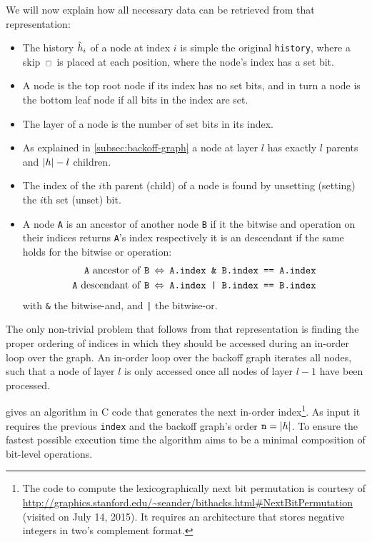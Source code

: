 We will now explain how all necessary data can be retrieved from that
representation:
\begin{itemize}
  \setlength{\itemsep}{0.4ex}
  \item The history $\DerivedHistory[i]$ of a node at index $i$ is simple
    the original \texttt{history}, where a skip $\Skp$ is placed at each
    position, where the node's index has a set bit.
  \item A node is the top root node if its index has no set bits, and in turn a
    node is the bottom leaf node if all bits in the index are set.
  \item The layer of a node is the number of set bits in its index.
  \item As explained in \cref{subsec:backoff-graph} a node at layer $l$ has
    exactly $l$ parents and ${\left|h\right|} - l$ children.
  \item The index of the $i$th parent (child) of a node is found by unsetting
    (setting) the $i$th set (unset) bit.
  \item A node \texttt{A} is an ancestor of another node \texttt{B}
    if it the bitwise and operation on their indices returns \texttt{A}'s index
    respectively it is an descendant if the same holds for the bitwise or
    operation:
    \begin{align*}
      \text{\texttt{A} ancestor of \texttt{B}} \: &\Leftrightarrow \: \texttt{A.index \& B.index == A.index} \\
      \text{\texttt{A} descendant of \texttt{B}} \: &\Leftrightarrow \: \texttt{A.index | B.index == B.index}
    \end{align*}
    with \texttt{\&} the bitwise-and, and \texttt{|} the bitwise-or.
\end{itemize}

The only non-trivial problem that follows from that representation is finding
the proper ordering of indices in which they should be accessed during an
in-order loop over the graph.
An in-order loop over the backoff graph iterates all nodes, such that a node
of layer $l$ is only accessed once all nodes of layer $l-1$ have been processed.

 gives an algorithm in C code that generates the
next in-order index\footnote{The code to compute the lexicographically next bit
permutation is courtesy of
\mbox{\url{http://graphics.stanford.edu/~seander/bithacks.html\#NextBitPermutation}}
(visited on July 14, 2015).
It requires an architecture that stores negative integers in two's complement
format.}.
As input it requires the previous \texttt{index} and the backoff graph's order
$\texttt{n} = {\left|h\right|}$.
To ensure the fastest possible execution time the algorithm aims to be a minimal
composition of bit-level operations.

